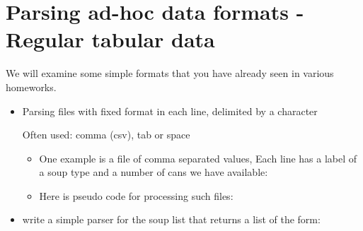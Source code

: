 \documentclass[letterpaper,10pt,english]{sphinxmanual}
\begin{document}
\section{Parsing ad-hoc data formats - Regular tabular data}
\label{\detokenize{lecture_notes/lec13_files_web:parsing-ad-hoc-data-formats-regular-tabular-data}}
We will examine some simple formats that you have already seen in
various homeworks.
\begin{itemize}
\item {} 
Parsing files with fixed format in each line, delimited by a
character

Often used: comma (csv), tab or space
\begin{itemize}
\item {} 
One example is a file of comma separated values, Each line has a label of a soup type and
a number of cans we have available:

%
\begin{sphinxVerbatim}[commandchars=\\\{\}]
  
  
\end{sphinxVerbatim}

\item {} 
Here is pseudo code for processing such files:

%
\begin{sphinxVerbatim}[commandchars=\\\{\}]
     
        
           
\end{sphinxVerbatim}

\end{itemize}

\item {} 
 write a simple parser for the soup list that returns a
list of the form:

%
\begin{sphinxVerbatim}[commandchars=\\\{\}]
\PYG{p}{[}    \PYG{p}{]}
\end{sphinxVerbatim}

\end{itemize}
\end{document}
